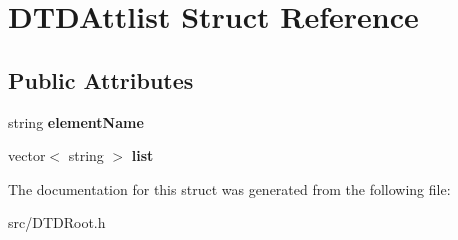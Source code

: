 \hypertarget{struct_d_t_d_attlist}{\section{\-D\-T\-D\-Attlist \-Struct \-Reference}
\label{struct_d_t_d_attlist}
}
\subsection*{\-Public \-Attributes}
\begin{DoxyCompactItemize}
\item 
\hypertarget{struct_d_t_d_attlist_aafa8dd68e0e9a4a4a85b45bb05e32365}{string {\bfseries element\-Name}}\label{struct_d_t_d_attlist_aafa8dd68e0e9a4a4a85b45bb05e32365}

\item 
\hypertarget{struct_d_t_d_attlist_a56266745cc26879824ca9c2e38d8a367}{vector$<$ string $>$ {\bfseries list}}\label{struct_d_t_d_attlist_a56266745cc26879824ca9c2e38d8a367}

\end{DoxyCompactItemize}


\-The documentation for this struct was generated from the following file\-:\begin{DoxyCompactItemize}
\item 
src/\-D\-T\-D\-Root.\-h\end{DoxyCompactItemize}
